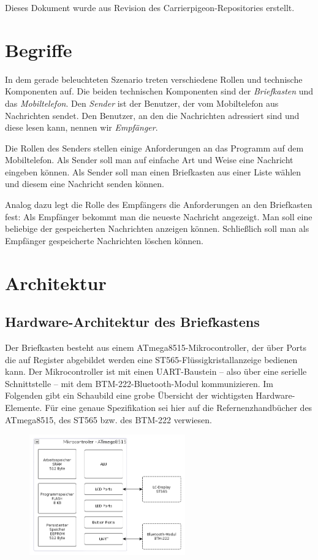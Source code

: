 \documentclass[ngerman]{article}
\begin{document}
Dieses Dokument wurde aus Revision \texttt{} des
Carrierpigeon-Repositories erstellt.

\section{Begriffe}

In dem gerade beleuchteten Szenario treten verschiedene Rollen und technische
Komponenten auf. Die beiden technischen Komponenten sind der
\textit{Briefkasten} und das \textit{Mobiltelefon}. Den \textit{Sender} ist der
Benutzer, der vom Mobiltelefon aus Nachrichten sendet. Den Benutzer, an den die
Nachrichten adressiert sind und diese lesen kann, nennen wir
\textit{Empfänger}.

Die Rollen des Senders stellen einige Anforderungen an das Programm auf dem
Mobiltelefon. Als Sender soll man auf einfache Art und Weise eine Nachricht
eingeben können. Als Sender soll man einen Briefkasten aus einer Liste wählen
und diesem eine Nachricht senden können.

Analog dazu legt die Rolle des Empfängers die Anforderungen an den Briefkasten
fest: Als Empfänger bekommt man die neueste Nachricht an\-gezeigt. Man soll
eine beliebige der gespeicherten Nachrichten anzeigen können. Schließlich soll
man als Empfänger gespeicherte Nachrichten löschen können.

\section{Architektur}

\subsection{Hardware-Architektur des Briefkastens}

Der Briefkasten besteht aus einem ATmega8515-Mikrocontroller, der über Ports
die auf Register abgebildet werden eine ST565-Flüssigkristallanzeige bedienen
kann. Der Mikrocontroller ist mit einen UART-Baustein -- also über eine serielle
Schnittstelle -- mit dem BTM-222-Bluetooth-Modul kommunizieren. Im Folgenden
gibt ein Schaubild eine grobe Übersicht der wichtigsten Hardware-Elemente. Für
eine genaue Spezifikation sei hier auf die Refernenzhandbücher des ATmega8515,
des ST565 bzw. des BTM-222 verwiesen.

\begin{figure}[h!] \begin{center}
    \includegraphics[width=0.6\textwidth]{media/letterbox-atmega-arch}
\end{center} \end{figure}
\end{document}
